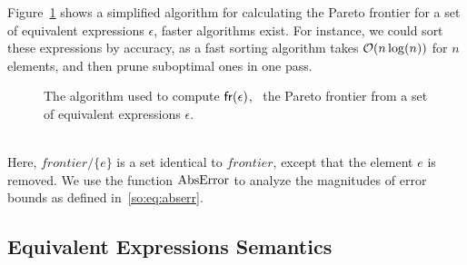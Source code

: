Figure~\ref{so:alg:pareto} shows a simplified algorithm for calculating
the Pareto frontier for a set of equivalent expressions $\epsilon$, faster
algorithms exist.  For instance, we could sort these expressions by accuracy,
as a fast sorting algorithm takes $\operatorname{\mathcal{O}}(n\log(n))$ for $n$ elements, and then
prune suboptimal ones in one pass.
\begin{figure}[ht]
    \centering
    \begin{algorithmic}
                    \EndIf{}
                \EndFor{}
            \EndFor{}
        \EndFunction%
    \end{algorithmic}
    \caption{%
        The algorithm used to compute $\operatorname{\mathsf{fr}}(\epsilon)$, \ie~the Pareto
        frontier from a set of equivalent expressions $\epsilon$.
    }\label{so:alg:pareto}
\end{figure} \\
Here, $\mathit{frontier} / \{ e \}$ is a set identical to $\mathit{frontier}$,
except that the element $e$ is removed.  We use the function $\operatorname{\mathrm{AbsError}}$ to
analyze the magnitudes of error bounds as defined in~\eqref{so:eq:abserr}.


\subsection{Equivalent Expressions Semantics}
\label{so:sub:equivalent_semantics}

